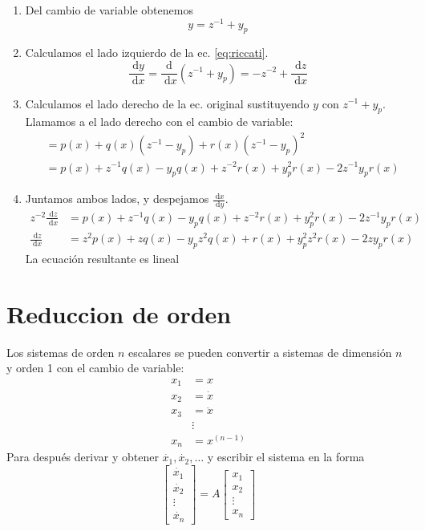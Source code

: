 \documentclass[a4paper]{article}
\newcommand{\dif}[1]{\;\mathrm{d}#1}
\begin{document}
\begin{enumerate}
    \item Del cambio de variable obtenemos
    \begin{equation*}
        y = z^{-1} + y_{p}
    \end{equation*}

    \item Calculamos el lado izquierdo de la ec. \eqref{eq:riccati}.
    \begin{equation*}
        \frac{\dif{y}}{\dif{x}} = \frac{\mathrm{d}}{\dif{x}} \left( z^{-1} + y_p \right) = -z^{-2} + \frac{\dif{z}}{\dif{x}}
    \end{equation*}

    \item Calculamos el lado derecho de la ec. original sustituyendo $y$ con $z^{-1} + y_p$.
    Llamamos a el lado derecho con el cambio de variable:
    \begin{align*}
       &= p(x) + q(x) (z^{-1} - y_p) + r(x) (z^{-1} - y_p)^{2} \\
       &= p(x) + z^{-1} q(x) - y_p q(x) + z^{-2} r(x) + y^{2}_{p} r(x) - 2 z^{-1} y_p r(x)
    \end{align*}

    \item Juntamos ambos lados, y despejamos $\frac{\dif{x}}{\dif{y}}$.
    \begin{align*}
        z^{-2}  \frac{\dif{z}}{\dif{x}} &= p(x) + z^{-1} q(x) - y_p q(x) + z^{-2} r(x) + y^{2}_{p} r(x) - 2 z^{-1} y_p r(x) \\
        \frac{\dif{z}}{\dif{x}} &= z^{2} p(x) + z q(x) - y_p z^{2} q(x) + r(x) + y^{2}_{p} z^{2} r(x) - 2 z y_p r(x)
    \end{align*}
    La ecuación resultante es lineal
\end{enumerate}

\section{Reduccion de orden}%
\label{sec:reduccion_de_orden}

Los sistemas de orden $ n $ escalares se pueden convertir a sistemas de dimensión $ n $ y orden 1 con el cambio de variable:
\begin{align*}
	x_1 &= x \\
	x_2 &= \dot{x} \\
	x_3 &= \ddot{x} \\
	&\vdots \\
	x_n &= x^{(n-1)}
\end{align*}
Para después derivar y obtener $ \dot{x_1}, \dot{x_2}, \ldots $ y escribir el sistema en la forma
\[
	\begin{bmatrix}
		\dot{x_1} \\
		\dot{x_2} \\
		\vdots \\
		\dot{x_n}
	\end{bmatrix} =
	A
	\begin{bmatrix}
		x_1 \\
		x_2	\\
		\vdots \\
		x_n
	\end{bmatrix}
\]
\end{document}
